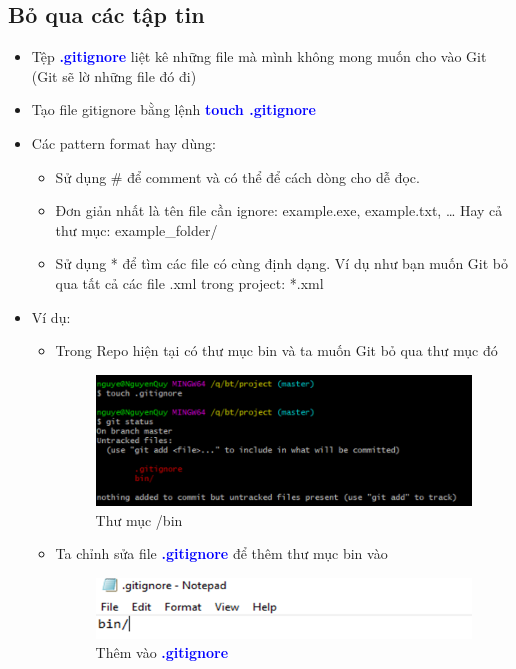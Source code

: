 \documentclass[12pt,a4paper]{report}
\begin{document}
\subsection{Bỏ qua các tập tin}
\begin{itemize}
\item Tệp \textcolor{blue}{\bf .gitignore} liệt kê những file mà mình không mong muốn cho vào Git (Git sẽ lờ những file đó đi)
\item Tạo file gitignore bằng lệnh \textcolor{blue}{\bf touch .gitignore}
\item Các pattern format hay dùng:
	\begin{itemize}
	\item Sử dụng \# để comment và có thể để cách dòng cho dễ đọc. 
	\item Đơn giản nhất là tên file cần ignore: example.exe, example.txt, …
	Hay cả thư mục: example\_folder/
	\item Sử dụng * để tìm các file có cùng định dạng. Ví dụ như bạn muốn Git bỏ qua tất cả các file .xml trong project: *.xml
	\end{itemize}
\item Ví dụ: 
\begin{itemize}
\item Trong Repo hiện tại có thư mục bin và ta muốn Git bỏ qua thư mục đó

\begin{figure}[!ht]
	\centering
	\includegraphics[width=0.8\linewidth]{screenshot009}
\caption{Thư mục /bin}
	\label{fig:screenshot009}
\end{figure}
\item Ta chỉnh sửa file \textcolor{blue}{\bf .gitignore }để thêm thư mục bin vào

\begin{figure}[!ht]
	\centering
	\includegraphics[width=0.8\linewidth]{screenshot010}
	\caption{Thêm vào \textcolor{blue}{\bf .gitignore }}
	\label{fig:screenshot010}
\end{figure}


\end{itemize}
\end{itemize}
\end{document}
